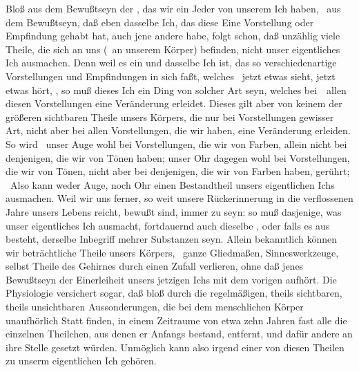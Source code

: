 \begin{aufza}
\item Bloß aus dem Bewußtseyn der , das wir ein Jeder von unserem Ich haben, \dh\ aus dem Bewußtseyn, daß eben dasselbe Ich, das diese Eine Vorstellung oder Empfindung gehabt hat, auch jene andere habe, folgt schon, daß unzählig viele Theile, die sich an uns (\dh\ an unserem Körper) befinden, nicht unser eigentliches Ich ausmachen. Denn weil es ein und dasselbe Ich ist, das so verschiedenartige Vorstellungen und Empfindungen in sich faßt, welches \zB\ jetzt etwas sieht, jetzt etwas hört, \usw , so muß dieses Ich ein Ding von solcher Art seyn, welches bei~\ allen diesen Vorstellungen eine Veränderung erleidet. Dieses gilt aber von keinem der größeren sichtbaren Theile unsers Körpers, die nur bei Vorstellungen gewisser Art, nicht aber bei allen Vorstellungen, die wir haben, eine Veränderung erleiden. So wird \zB\ unser Auge wohl bei Vorstellungen, die wir von Farben, allein nicht bei denjenigen, die wir von Tönen haben; unser Ohr dagegen wohl bei Vorstellungen, die wir von Tönen, nicht aber bei denjenigen, die wir von Farben haben, gerührt; \usw\ Also kann weder Auge, noch Ohr einen Bestandtheil unsers eigentlichen Ichs ausmachen. Weil wir uns ferner, so weit unsere Rückerinnerung in die verflossenen Jahre unsers Lebens reicht, bewußt sind, immer  zu seyn: so muß dasjenige, was unser eigentliches Ich ausmacht, fortdauernd auch dieselbe , oder falls es aus  besteht, derselbe Inbegriff mehrer Substanzen seyn. Allein bekanntlich können wir beträchtliche Theile unsers Körpers, \zB\ ganze Gliedmaßen, Sinneswerkzeuge, selbst Theile des Gehirnes durch einen Zufall verlieren, ohne daß jenes Bewußtseyn der Einerleiheit unsers jetzigen Ichs mit dem vorigen aufhört. Die Physiologie versichert sogar, daß bloß durch die regelmäßigen, theils sichtbaren, theils unsichtbaren Aussonderungen, die bei dem menschlichen Körper unaufhörlich Statt finden, in einem Zeitraume von etwa zehn Jahren fast alle die einzelnen Theilchen, aus denen er Anfangs bestand, entfernt, und dafür andere an ihre Stelle gesetzt würden. Unmöglich kann also irgend einer von diesen  Theilen zu unserm eigentlichen Ich gehören.

\end{aufza}
